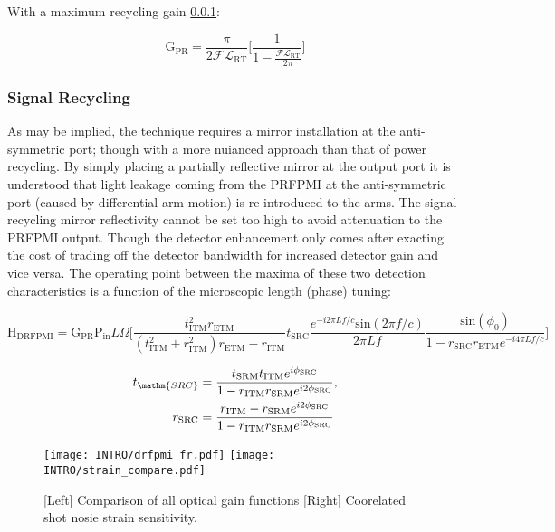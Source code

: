 With a maximum recycling gain \ref{}: 

\begin{equation}
	\mathrm{G_{PR}} = \frac{\pi}{2 \mathscr{F} \mathscr{L}_\mathrm{RT}} \bigg[ \frac{1}{1- \frac{ \mathscr{F} \mathscr{L}_\mathrm{RT}}{ 2 \pi}} \bigg]
\end{equation}

\subsubsection{Signal Recycling}
As may be implied, the technique requires a mirror installation at the anti-symmetric port; though with a more nuianced approach than that of power recycling. By simply placing a partially reflective mirror at the output port it is understood that light leakage coming from the PRFPMI at the anti-symmetric port (caused by differential arm motion) is re-introduced to the arms. The signal recycling mirror reflectivity cannot be set too high to avoid attenuation to the PRFPMI output. Though the detector enhancement only comes after exacting the cost of trading off the detector bandwidth for increased detector gain and vice versa. The operating point between the maxima of these two detection characteristics is a function of the microscopic length (phase) tuning:

\begin{equation}
	\mathrm{H}_\mathrm{DRFPMI} = \mathrm{G}_\mathrm{PR} \mathrm{P}_\mathrm{in} L \Omega \bigg[ \frac{ t_\mathrm{ITM}^2 r_\mathrm{ETM}}{(t_\mathrm{ITM}^2 + r_\mathrm{ITM}^2)r_\mathrm{ETM} - r_\mathrm{ITM}}  t_\mathrm{SRC} \frac{e^{-i 2 \pi L f / c} \mathrm{sin}( 2 \pi f / c)}{ 2 \pi L f } \frac{\mathrm{sin}(\phi_0)}{1- r_\mathrm{SRC}r_\mathrm{ETM} e^{-i 4 \pi L f / c}} \bigg]
\end{equation}

\begin{equation}
\begin{align}
	t_\mathm{SRC} & = \frac{t_\mathrm{SRM} t_\mathrm{ITM} e^{i\phi_\mathrm{SRC}}}{1-r_\mathrm{ITM} r_\mathrm{SRM} e^{i2\phi_\mathrm{SRC}}}, \\
	r_\mathrm{SRC} & = \frac{r_\mathrm{ITM} - r_\mathrm{SRM} e^{i2\phi_\mathrm{SRC}}}{1-r_\mathrm{ITM} r_\mathrm{SRM} e^{i2\phi_\mathrm{SRC}}} \\
\end{align}
\end{equation}

\begin{figure}[H]
  \begin{subcaptiongroup}
	  \texttt{[image: INTRO/drfpmi\_fr.pdf]}
 	  \texttt{[image: INTRO/strain\_compare.pdf]}
  \end{subcaptiongroup}
  \hfill
  \caption{[Left] Comparison of all optical gain functions [Right] Coorelated shot nosie strain sensitivity.}
  \label{fig:drfpmi_gain_and_strain}
\end{figure}

